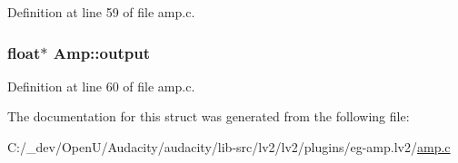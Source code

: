 Definition at line 59 of file amp.\+c.

\subsubsection[{\texorpdfstring{output}{output}}]{\setlength{\rightskip}{0pt plus 5cm}float$\ast$ Amp\+::output}\hypertarget{struct_amp_a098d44d8c4cbdac5329fbc890632ad22}{}\label{struct_amp_a098d44d8c4cbdac5329fbc890632ad22}


Definition at line 60 of file amp.\+c.



The documentation for this struct was generated from the following file\+:\begin{DoxyCompactItemize}
\item 
C\+:/\+\_\+dev/\+Open\+U/\+Audacity/audacity/lib-\/src/lv2/lv2/plugins/eg-\/amp.\+lv2/\hyperlink{amp_8c}{amp.\+c}\end{DoxyCompactItemize}
